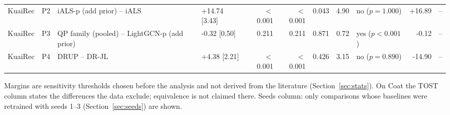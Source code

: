 \begin{table}[htbp]
{\begin{tabular}{llllrrrrlrl}
KuaiRec & P2 & iALS-p (add prior) -- iALS & +14.74 [3.43] & $<$0.001 & $<$0.001 & 0.043 & 4.90 & no ($p=1.000$) & +16.89 & -- \\
KuaiRec & P3 & QP family (pooled) -- LightGCN-p (add prior) & -0.32 [0.50] & 0.211 & 0.211 & 0.871 & 0.72 & yes ($p<0.001$) & -0.12 & -- \\
KuaiRec & P4 & DRUP -- DR-JL & +4.38 [2.21] & $<$0.001 & $<$0.001 & 0.426 & 3.15 & no ($p=0.890$) & -14.90 & -- \\
\bottomrule
\end{tabular}}
\par\smallskip\raggedright\footnotesize Margins are sensitivity thresholds chosen before the analysis and not derived from the literature (Section~\ref{sec:stats}). On Coat the TOST column states the differences the data exclude; equivalence is not claimed there. Seeds column: only comparisons whose baselines were retrained with seeds 1--3 (Section~\ref{sec:seeds}) are shown.
\end{table}
